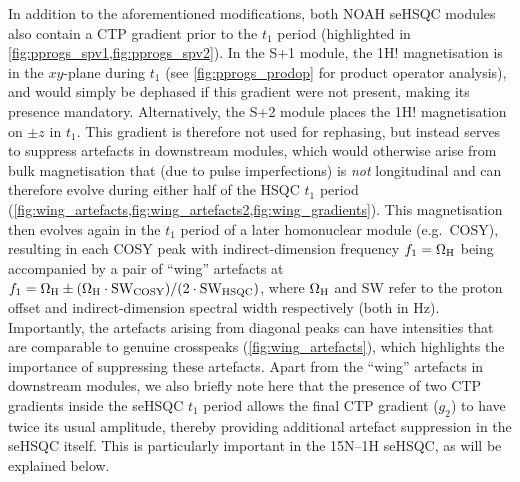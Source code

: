 \documentclass[11pt]{article}
\newcommand*{\noahSpa}{S+1}
\newcommand*{\noahSpb}{S+2}
\newcommand*{\proton}{1H}
\newcommand*{\nitrogen}{15N}
\newcommand*{\magnnot}[1]{1H!#1}
\begin{document}
\begin{refsection}
In addition to the aforementioned modifications, both NOAH seHSQC modules also contain a CTP gradient prior to the $t_1$ period (highlighted in \cref{fig:pprogs_spv1,fig:pprogs_spv2}).
In the \noahSpa{} module, the \magnnot{} magnetisation is in the $xy$-plane during $t_1$ (see \cref{fig:pprogs_prodop} for product operator analysis), and would simply be dephased if this gradient were not present, making its presence mandatory.
Alternatively, the \noahSpb{} module places the \magnnot{} magnetisation on $\pm z$ in $t_1$.
This gradient is therefore not used for rephasing, but instead serves to suppress artefacts in downstream modules, which would otherwise arise from bulk magnetisation that (due to pulse imperfections) is \textit{not} longitudinal and can therefore evolve during either half of the HSQC $t_1$ period (\cref{fig:wing_artefacts,fig:wing_artefacts2,fig:wing_gradients}).
This magnetisation then evolves again in the $t_1$ period of a later homonuclear module (e.g.\ COSY), resulting in each COSY peak with indirect-dimension frequency $f_1 = \Omega_{\ce{H}}$ being accompanied by a pair of ``wing'' artefacts at $f_1 = \Omega_{\ce{H}} \pm (\Omega_{\ce{H}}\cdot\mathrm{SW_{COSY}})/(2\cdot \mathrm{SW_{HSQC}})$, where $\Omega_{\ce{H}}$ and SW refer to the proton offset and indirect-dimension spectral width respectively (both in Hz).
Importantly, the artefacts arising from diagonal peaks can have intensities that are comparable to genuine crosspeaks (\cref{fig:wing_artefacts}), which highlights the importance of suppressing these artefacts.
Apart from the ``wing'' artefacts in downstream modules, we also briefly note here that the presence of two CTP gradients inside the seHSQC $t_1$ period allows the final CTP gradient ($g_2$) to have twice its usual amplitude, thereby providing additional artefact suppression in the seHSQC itself.
This is particularly important in the \nitrogen{}--\proton{} seHSQC, as will be explained below.


\end{refsection}
\end{document}
